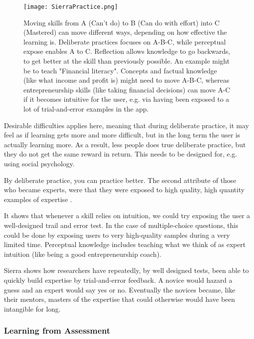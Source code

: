   \begin{figure}[h]
    \centering
    \texttt{[image: SierraPractice.png]}
    \caption{Moving skills from A (Can't do) to B (Can do with effort) into C (Mastered) can move different ways, depending on how effective the learning is. Deliberate practices focuses on A-B-C, while perceptual expose enables A to C. Reflection allows knowledge to go backwards, to get better at the skill than previously possible. An example might be to teach "Financial literacy". Concepts and factual knowledge (like what income and profit is) might need to move A-B-C, whereas entrepreneurship skills (like taking financial decisions) can move A-C if it becomes intuitive for the user, e.g. via having been exposed to a lot of trial-and-error examples in the app.}
    \label{fig:sierra-practice}
  \end{figure}

  Desirable difficulties applies here, meaning that during deliberate practice, it may feel as if learning gets more and more difficult, but in the long term the user is actually learning more. As a result, less people does true deliberate practice, but they do not get the same reward in return. This needs to be designed for, e.g. using social psychology.

  By deliberate practice, you can practice better. The second attribute of those who became experts, were that they were exposed to high quality, high quantity examples of expertise \citep{sierra}.

  It shows that whenever a skill relies on intuition, we could try exposing the user a well-designed trail and error test. In the case of multiple-choice questions, this could be done by exposing users to very high-quality samples during a very limited time. Perceptual knowledge includes teaching what we think of as expert intuition (like being a good entrepreneurship coach).

  Sierra shows how researchers have repeatedly, by well designed tests, been able to quickly build expertise by trial-and-error feedback. A novice would hazard a guess and an expert would say yes or no. Eventually the novices became, like their mentors, masters of the expertise that could otherwise would have been intangible for long.

  \subsubsection{Learning from Assessment}\label{learning-assessment}

